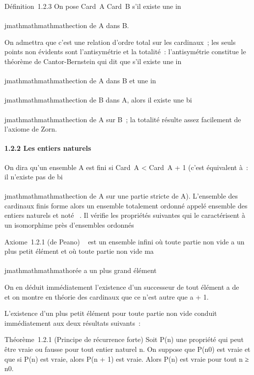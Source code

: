 Définition~1.2.3 On pose Card~A
\leq Card~B s'il existe une in\\\\jmathmathmathmathection de A dans B.

On admettra que c'est une relation d'ordre total sur les cardinaux~; les
seuls points non évidents sont l'antisymétrie et la totalité~:
l'antisymétrie constitue le théorème de Cantor-Bernstein qui dit que
s'il existe une in\\\\jmathmathmathmathection de A dans B et une in\\\\jmathmathmathmathection de B dans A,
alors il existe une bi\\\\jmathmathmathmathection de A sur B~; la totalité résulte assez
facilement de l'axiome de Zorn.

\paragraph{1.2.2 Les entiers naturels}

On dira qu'un ensemble A est fini si Card~A
\textless{} Card~A + 1 (c'est équivalent à~: il
n'existe pas de bi\\\\jmathmathmathmathection de A sur une partie stricte de A). L'ensemble
des cardinaux finis forme alors un ensemble totalement ordonné appelé
ensemble des entiers naturels et noté ~. Il vérifie les propriétés
suivantes qui le caractérisent à un isomorphime près d'ensembles
ordonnés

Axiome~1.2.1 (de Peano) ~ est un ensemble infini où toute partie non
vide a un plus petit élément et où toute partie non vide ma\\\\jmathmathmathmathorée a un
plus grand élément

On en déduit immédiatement l'existence d'un successeur de tout élément a
de ~ et on montre en théorie des cardinaux que ce n'est autre que a + 1.

L'existence d'un plus petit élément pour toute partie non vide conduit
immédiatement aux deux résultats suivants~:

Théorème~1.2.1 (Principe de récurrence forte) Soit P(n) une propriété
qui peut être vraie ou fausse pour tout entier naturel n. On suppose que
P(n0) est vraie et que si P(n) est vraie, alors P(n + 1) est
vraie. Alors P(n) est vraie pour tout n ≥ n0.

